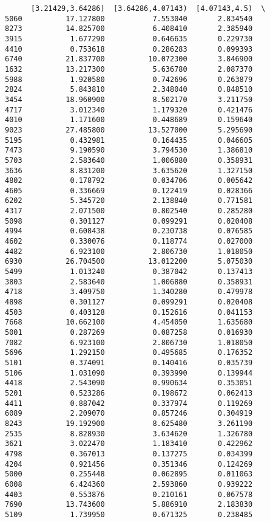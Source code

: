 \documentclass[11pt]{article}
\begin{document}
\begin{verbatim}
      [3.21429,3.64286)  [3.64286,4.07143)  [4.07143,4.5)  \
5060          17.127800           7.553040       2.834540   
8273          14.825700           6.408410       2.385940   
3915           1.677290           0.646635       0.229730   
4410           0.753618           0.286283       0.099393   
6740          21.837700          10.072300       3.846900   
1632          13.217300           5.636780       2.087370   
5988           1.920580           0.742696       0.263879   
2824           5.843810           2.348040       0.848510   
3454          18.960900           8.502170       3.211750   
4717           3.012340           1.179320       0.421476   
4010           1.171600           0.448689       0.159640   
9023          27.485800          13.527000       5.295690   
5195           0.432981           0.164435       0.046605   
7473           9.190590           3.794530       1.386810   
5703           2.583640           1.006880       0.358931   
3636           8.831200           3.635620       1.327150   
4802           0.178792           0.034706       0.005642   
4605           0.336669           0.122419       0.028366   
6202           5.345720           2.138840       0.771581   
4317           2.071500           0.802540       0.285280   
5098           0.301127           0.099291       0.020408   
4994           0.608438           0.230738       0.076585   
4602           0.330076           0.118774       0.027000   
4482           6.923100           2.806730       1.018050   
6930          26.704500          13.012200       5.075030   
5499           1.013240           0.387042       0.137413   
3803           2.583640           1.006880       0.358931   
4718           3.409750           1.340280       0.479978   
4898           0.301127           0.099291       0.020408   
4503           0.403128           0.152616       0.041153   
7668          10.662100           4.454050       1.635680   
5001           0.287269           0.087258       0.016930   
7082           6.923100           2.806730       1.018050   
5696           1.292150           0.495685       0.176352   
5101           0.374091           0.140416       0.035739   
5106           1.031090           0.393990       0.139944   
4418           2.543090           0.990634       0.353051   
5201           0.523286           0.198672       0.062413   
4411           0.887042           0.337974       0.119269   
6089           2.209070           0.857246       0.304919   
8243          19.192900           8.625480       3.261190   
2535           8.828930           3.634620       1.326780   
3621           3.022470           1.183410       0.422962   
4798           0.367013           0.137275       0.034399   
4204           0.921456           0.351346       0.124269   
5000           0.255448           0.062895       0.011063   
6008           6.424360           2.593860       0.939222   
4403           0.553876           0.210161       0.067578   
7690          13.743600           5.886910       2.183830   
5109           1.739950           0.671325       0.238485   


\end{verbatim}
\end{document}
